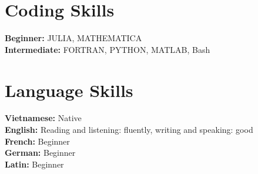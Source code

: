 \documentclass[letterpaper,11pt]{article}
\newcommand{\resumeSubHeadingListStart}{\begin{itemize}[leftmargin=0.15in, label={}]}
\newcommand{\resumeSubHeadingListEnd}{\end{itemize}}
\begin{document}
\section{Coding Skills}
\vspace{2pt}
\resumeSubHeadingListStart
\small{\item{
		\textbf{Beginner:}{ JULIA, MATHEMATICA} \\ \vspace{3pt}
		\textbf{Intermediate:}{ FORTRAN, PYTHON, MATLAB, Bash}
		
		
}}
\resumeSubHeadingListEnd




\section{Language Skills}
\vspace{2pt}
\resumeSubHeadingListStart
\small{\item{
		\textbf{Vietnamese:}{ Native} \\ \vspace{3pt}
		\textbf{English:}{ Reading and listening: fluently, writing and speaking: good}\\ \vspace{3pt}
		\textbf{French:}{ Beginner} \\ \vspace{3pt}
		\textbf{German:}{ Beginner} \\ \vspace{3pt}
		\textbf{Latin:}{ Beginner}
		
		
}}
\resumeSubHeadingListEnd
\end{document}
